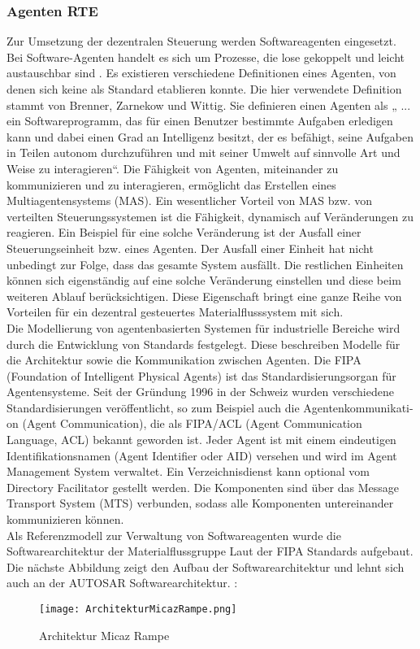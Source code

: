 \subsubsection{Agenten RTE}

Zur Umsetzung der dezentralen Steuerung werden Softwareagenten eingesetzt. Bei Software-Agenten handelt es sich um Prozesse, die lose gekoppelt 
und leicht austauschbar sind \cite[vgl.][S. 31-37]{GH:2010}. Es existieren verschiedene Definitionen eines Agenten, von denen
sich keine als Standard etablieren konnte. Die hier verwendete Definition stammt von
Brenner, Zarnekow und Wittig. Sie definieren einen Agenten als „ ... ein Softwareprogramm,
das für einen Benutzer bestimmte Aufgaben erledigen kann und dabei einen Grad an
Intelligenz besitzt, der es befähigt, seine Aufgaben in Teilen autonom durchzuführen und mit
seiner Umwelt auf sinnvolle Art und Weise zu interagieren“\cite{BZW:1998}. Die Fähigkeit von Agenten, miteinander zu kommunizieren 
und zu interagieren, ermöglicht das Erstellen eines Multiagentensystems (MAS). Ein wesentlicher Vorteil von MAS 
bzw. von verteilten Steuerungssystemen ist die Fähigkeit, dynamisch auf Veränderungen zu reagieren. Ein Beispiel für eine solche Veränderung ist der
Ausfall einer Steuerungseinheit bzw. eines Agenten. Der Ausfall einer Einheit hat nicht unbedingt zur Folge, dass das gesamte System ausfällt. 
Die restlichen Einheiten können sich eigenständig auf eine solche Veränderung einstellen und diese beim weiteren Ablauf
berücksichtigen\cite[S. 13]{Roidl:2012}. Diese Eigenschaft bringt eine ganze Reihe von Vorteilen für ein dezentral
gesteuertes Materialflusssystem mit sich.\\
Die Modellierung von agentenbasierten Systemen für industrielle Bereiche wird durch die
Entwicklung von Standards festgelegt. Diese beschreiben Modelle für die Architektur
sowie die Kommunikation zwischen Agenten. Die FIPA (Foundation of Intelligent Physical Agents) ist das Standardisierungsorgan
für Agentensysteme.  Seit der Gründung 1996 in der Schweiz wurden verschiedene
Standardisierungen veröffentlicht, so zum Beispiel auch die Agentenkommunikati-
on (Agent Communication), die als FIPA/ACL (Agent Communication Language, ACL) bekannt geworden ist. Jeder Agent ist mit einem eindeutigen
Identifikationsnamen (Agent Identifier oder AID) versehen und wird im Agent Management System verwaltet\cite[S. 24]{Roidl:2012}.
Ein Verzeichnisdienst kann optional vom Directory Facilitator gestellt
werden. Die Komponenten sind über das Message Transport System (MTS) verbunden,
sodass alle Komponenten untereinander kommunizieren können\cite[S. 24]{Roidl:2012}. \\
Als Referenzmodell zur Verwaltung von Softwareagenten wurde die Softwarearchitektur der Materialflussgruppe Laut der  FIPA Standards aufgebaut. 
Die nächste Abbildung zeigt den Aufbau der Softwarearchitektur und lehnt sich auch an der AUTOSAR Softwarearchitektur. :
\begin{figure}[h!]
	\centering
		\texttt{[image: ArchitekturMicazRampe.png]}
	\caption{Architektur Micaz Rampe\cite{Stasch:Hahn}}
	\label{ArchitekturMicazRampe}
\end{figure}
